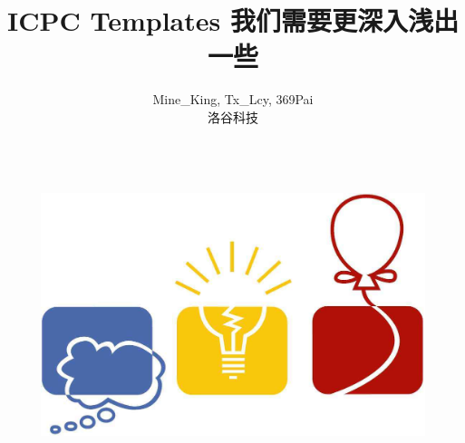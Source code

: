 \documentclass[12pt]{report}
\title{\Huge \textbf{ICPC Templates} \linebreak \linebreak \large \textcolor{primary-blue}{\textbf{我们需要更深入浅出一些}}}
\author{Mine\_King, Tx\_Lcy, 369Pai \\ \small 洛谷科技}
\begin{document}
\setlength{\headheight}{5mm}
\setlength{\headsep}{5mm}

\begin{titlepage}
    \begin{figure}
        \centering
        \includegraphics[height=8cm]{images/logo.jpg}
    \end{figure}
    
    \maketitle
\end{titlepage}


\tableofcontents       %
\clearpage


\newpage
\setcounter{page}{1}   %



%

%

%

%

%

%

%

%

\end{document}
